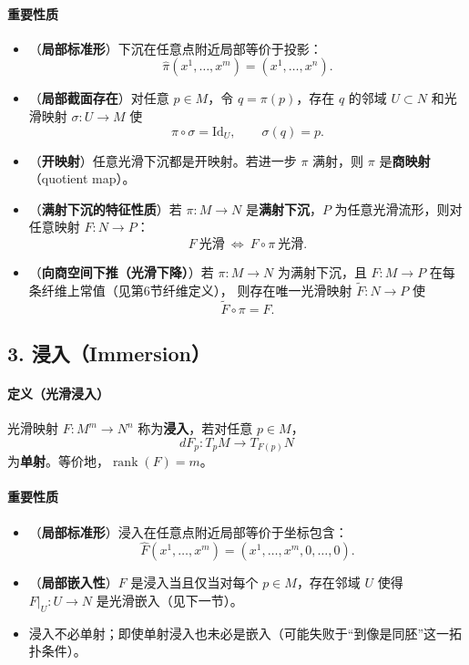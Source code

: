 \documentclass[12pt]{article}
\newcommand{\rank}{\operatorname{rank}}
\begin{document}
\paragraph{重要性质}
\begin{itemize}
\item （\textbf{局部标准形}）下沉在任意点附近局部等价于投影：
\[
\widehat\pi(x^1,\dots,x^m)=(x^1,\dots,x^n).
\]
\item （\textbf{局部截面存在}）对任意 $p\in M$，令 $q=\pi(p)$，存在 $q$ 的邻域 $U\subset N$ 和光滑映射
$\sigma:U\to M$ 使
\[
\pi\circ\sigma=\mathrm{Id}_U,\qquad \sigma(q)=p.
\]
\item （\textbf{开映射}）任意光滑下沉都是开映射。若进一步 $\pi$ 满射，则 $\pi$ 是\textbf{商映射}（quotient map）。
\item （\textbf{满射下沉的特征性质}）若 $\pi:M\to N$ 是\textbf{满射下沉}，$P$ 为任意光滑流形，则对任意映射 $F:N\to P$：
\[
F\ \text{光滑}\ \Longleftrightarrow\ F\circ\pi\ \text{光滑}.
\]
\item （\textbf{向商空间下推（光滑下降）}）若 $\pi:M\to N$ 为满射下沉，且 $F:M\to P$ 在每条纤维上常值（见第6节纤维定义），
则存在唯一光滑映射 $\widetilde F:N\to P$ 使
\[
\widetilde F\circ\pi=F.
\]
\end{itemize}

\subsection*{3. 浸入（Immersion）}
\paragraph{定义（光滑浸入）}
光滑映射 $F:M^m\to N^n$ 称为\textbf{浸入}，若对任意 $p\in M$，
\[
dF_p:T_pM\to T_{F(p)}N
\]
为\textbf{单射}。等价地，$\rank(F)=m$。

\paragraph{重要性质}
\begin{itemize}
\item （\textbf{局部标准形}）浸入在任意点附近局部等价于坐标包含：
\[
\widehat F(x^1,\dots,x^m)=(x^1,\dots,x^m,0,\dots,0).
\]
\item （\textbf{局部嵌入性}）$F$ 是浸入当且仅当对每个 $p\in M$，存在邻域 $U$ 使得
$F|_U:U\to N$ 是光滑嵌入（见下一节）。
\item 浸入不必单射；即使单射浸入也未必是嵌入（可能失败于“到像是同胚”这一拓扑条件）。
\end{itemize}
\end{document}
